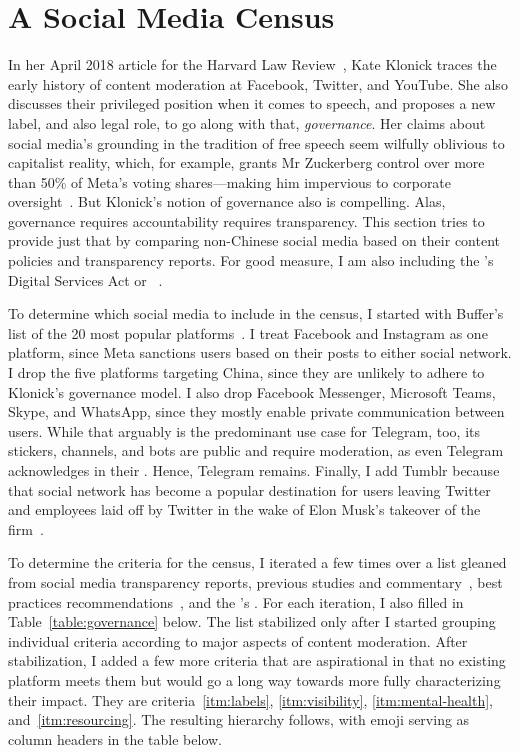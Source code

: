 \section{A Social Media Census}
\label{sec:census}

In her April 2018 article for the Harvard Law Review~\cite{Klonick2018}, Kate
Klonick traces the early history of content moderation at Facebook, Twitter, and
YouTube. She also discusses their privileged position when it comes to speech,
and proposes a new label, and also legal role, to go along with that,
\emph{governance}. Her claims about social media's grounding in the tradition of
free speech seem wilfully oblivious to capitalist reality, which, for example,
grants Mr Zuckerberg control over more than 50\% of Meta's voting
shares---making him impervious to corporate
oversight~\cite{LauricellaNorton2021}. But Klonick's notion of governance also
is compelling. Alas, governance requires accountability requires transparency.
This section tries to provide just that by comparing non-Chinese social media
based on their content policies and transparency reports. For good measure, I am
also including the 's Digital Services Act or
~\cite{EuropeanParliamentAndCouncil2022}.

To determine which social media to include in the census, I started with
Buffer's list of the 20 most popular platforms~\cite{Lua2022}. I treat Facebook
and Instagram as one platform, since Meta sanctions users based on their posts
to either social network. I drop the five platforms targeting China, since they
are unlikely to adhere to Klonick's governance model. I also drop Facebook
Messenger, Microsoft Teams, Skype, and WhatsApp, since they mostly enable
private communication between users. While that arguably is the predominant use
case for Telegram, too, its stickers, channels, and bots are public and require
moderation, as even Telegram acknowledges in their . Hence, Telegram
remains. Finally, I add Tumblr because that social network has become a popular
destination for users leaving Twitter and employees laid off by Twitter in the
wake of Elon Musk's takeover of the firm~\cite{Patel2022}.

To determine the criteria for the census, I iterated a few times over a list
gleaned from social media transparency reports, previous studies and
commentary~\cite{BradfordGriselea2019,CrockerGebhartea2019,Douek2022}, best
practices
recommendations~\cite{AccessNowACLUFoundationOfNorthernCaliforniaea2021}, and
the 's . For each iteration, I also filled in
Table~\ref{table:governance} below. The list stabilized only after I started
grouping individual criteria according to major aspects of content moderation.
After stabilization, I added a few more criteria that are aspirational in that
no existing platform meets them but would go a long way towards more fully
characterizing their impact. They are criteria~\ref{itm:labels},
\ref{itm:visibility}, \ref{itm:mental-health}, and~\ref{itm:resourcing}. The
resulting hierarchy follows, with emoji serving as column headers in the table
below.

